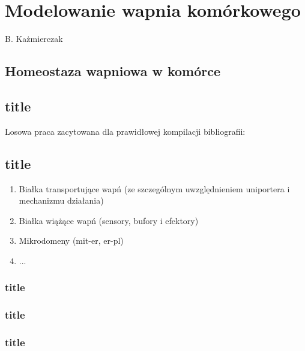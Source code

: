 \chapter{Modelowanie wapnia komórkowego}
B. Każmierczak

\section{Homeostaza wapniowa w komórce}

\section{title}


Losowa praca zacytowana dla prawidłowej kompilacji bibliografii: \cite{Abu-Hamad2009}

\section{title}


\begin{enumerate}
	\item Białka transportujące wapń (ze szczególnym uwzględnieniem uniportera i mechanizmu działania)
	\item Białka wiążące wapń (sensory, bufory i efektory)
	\item Mikrodomeny (mit-er, er-pl)
	\item ...
\end{enumerate}

\subsection{title}

\subsection{title}

\subsection{title}

